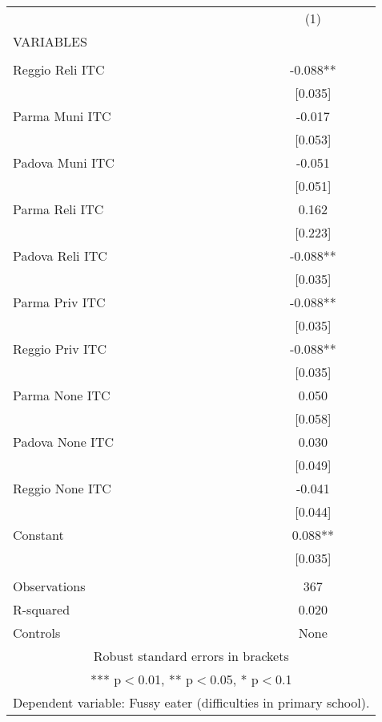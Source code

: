\begin{tabular}{lc} \hline
 & (1) \\
VARIABLES &  \\ \hline
 &  \\
Reggio Reli ITC & -0.088** \\
 & [0.035] \\
Parma Muni ITC & -0.017 \\
 & [0.053] \\
Padova Muni ITC & -0.051 \\
 & [0.051] \\
Parma Reli ITC & 0.162 \\
 & [0.223] \\
Padova Reli ITC & -0.088** \\
 & [0.035] \\
Parma Priv ITC & -0.088** \\
 & [0.035] \\
Reggio Priv ITC & -0.088** \\
 & [0.035] \\
Parma None ITC & 0.050 \\
 & [0.058] \\
Padova None ITC & 0.030 \\
 & [0.049] \\
Reggio None ITC & -0.041 \\
 & [0.044] \\
Constant & 0.088** \\
 & [0.035] \\
 &  \\
Observations & 367 \\
R-squared & 0.020 \\
 Controls & None \\ \hline
\multicolumn{2}{c}{ Robust standard errors in brackets} \\
\multicolumn{2}{c}{ *** p$<$0.01, ** p$<$0.05, * p$<$0.1} \\
\multicolumn{2}{c}{ Dependent variable: Fussy eater (difficulties in primary school).} \\
\end{tabular}
